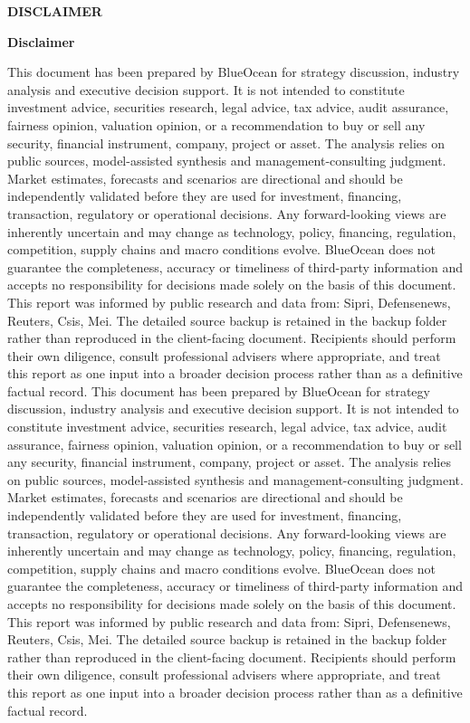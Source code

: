 \documentclass[10pt,a4paper]{article}
\begin{document}
\clearpage
{\textcolor{BOBlue}{\scriptsize\bfseries DISCLAIMER}}\par\vspace{3pt}
{\Large\sffamily\bfseries\color{BONavy} Disclaimer}\par\vspace{4pt}
\vspace{2pt}{\color{BOBright}\rule{\linewidth}{1pt}}\vspace{5pt}
{\footnotesize\color{BOMuted} This document has been prepared by BlueOcean for strategy discussion, industry analysis and executive decision support. It is not intended to constitute investment advice, securities research, legal advice, tax advice, audit assurance, fairness opinion, valuation opinion, or a recommendation to buy or sell any security, financial instrument, company, project or asset. The analysis relies on public sources, model-assisted synthesis and management-consulting judgment. Market estimates, forecasts and scenarios are directional and should be independently validated before they are used for investment, financing, transaction, regulatory or operational decisions. Any forward-looking views are inherently uncertain and may change as technology, policy, financing, regulation, competition, supply chains and macro conditions evolve. BlueOcean does not guarantee the completeness, accuracy or timeliness of third-party information and accepts no responsibility for decisions made solely on the basis of this document. This report was informed by public research and data from: Sipri, Defensenews, Reuters, Csis, Mei. The detailed source backup is retained in the backup folder rather than reproduced in the client-facing document. Recipients should perform their own diligence, consult professional advisers where appropriate, and treat this report as one input into a broader decision process rather than as a definitive factual record. This document has been prepared by BlueOcean for strategy discussion, industry analysis and executive decision support. It is not intended to constitute investment advice, securities research, legal advice, tax advice, audit assurance, fairness opinion, valuation opinion, or a recommendation to buy or sell any security, financial instrument, company, project or asset. The analysis relies on public sources, model-assisted synthesis and management-consulting judgment. Market estimates, forecasts and scenarios are directional and should be independently validated before they are used for investment, financing, transaction, regulatory or operational decisions. Any forward-looking views are inherently uncertain and may change as technology, policy, financing, regulation, competition, supply chains and macro conditions evolve. BlueOcean does not guarantee the completeness, accuracy or timeliness of third-party information and accepts no responsibility for decisions made solely on the basis of this document. This report was informed by public research and data from: Sipri, Defensenews, Reuters, Csis, Mei. The detailed source backup is retained in the backup folder rather than reproduced in the client-facing document. Recipients should perform their own diligence, consult professional advisers where appropriate, and treat this report as one input into a broader decision process rather than as a definitive factual record.}
\end{document}
